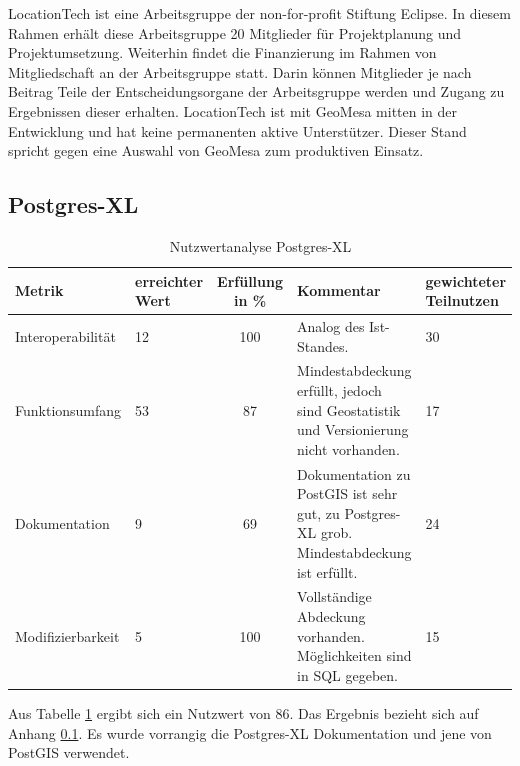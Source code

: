 LocationTech ist eine Arbeitsgruppe der non-for-profit Stiftung Eclipse.
In diesem Rahmen erhält diese Arbeitsgruppe 20 Mitglieder für Projektplanung und Projektumsetzung.
Weiterhin findet die Finanzierung im Rahmen von Mitgliedschaft an der Arbeitsgruppe statt.
Darin können Mitglieder je nach Beitrag Teile der Entscheidungsorgane der Arbeitsgruppe werden und Zugang zu Ergebnissen dieser erhalten. \cite{website:locationtech-about}
LocationTech ist mit GeoMesa mitten in der Entwicklung und hat keine permanenten aktive Unterstützer.
Dieser Stand spricht gegen eine Auswahl von GeoMesa zum produktiven Einsatz.

\subsection{Postgres-XL}
\label{gegenuerbestellung:postgresxl}
\begin{table}[h!]
\centering
\small
\begin{tabular}{l|p{1.8cm}|c|p{3.1cm}|p{1.8cm}}
\textbf{Metrik} & \textbf{erreichter Wert} & \textbf{Erfüllung in \%} & \textbf{Kommentar} & \textbf{gewichteter Teilnutzen} \\ \hline
Interoperabilität & 12 & 100 & Analog des Ist-Standes. & 30 \\ \hline
Funktionsumfang & 53 & 87 & Mindestabdeckung erfüllt, jedoch sind Geostatistik und Versionierung nicht vorhanden. & 17 \\ \hline
Dokumentation & 9 & 69 & Dokumentation zu PostGIS ist sehr gut, zu Postgres-XL grob. Mindestabdeckung ist erfüllt. & 24 \\ \hline
Modifizierbarkeit & 5 & 100 & Vollständige Abdeckung vorhanden. Möglichkeiten sind in SQL gegeben. & 15 \\
\end{tabular}
\caption{Nutzwertanalyse Postgres-XL}
\label{table:nutzwertanalyse-postgresxl}
\end{table}
Aus Tabelle \ref{table:nutzwertanalyse-postgresxl} ergibt sich ein Nutzwert von 86.
Das Ergebnis bezieht sich auf Anhang \ref{gegenuerbestellung:postgresxl}.
Es wurde vorrangig die Postgres-XL Dokumentation \cite{website:postgresxl-manual} und jene von PostGIS \cite{website:postgisdocu-functions} verwendet.

